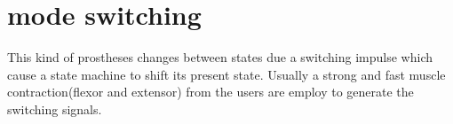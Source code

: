 \section{mode switching}
This kind of prostheses changes between states due a switching impulse which cause a state machine to shift its present state. Usually a strong and fast muscle contraction(flexor and extensor) from the users are employ to generate the switching signals.